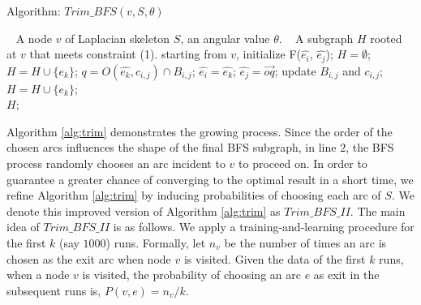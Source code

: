 \begin{algorithm}[t]
\caption{Algorithm: $Trim\_BFS(v, S,\theta)$}
\label{alg:trim}
\begin{algorithmic}[1]
\REQUIRE~
A node $v$ of Laplacian skeleton $S$, an angular value $\theta$.
\ENSURE~
 A subgraph $H$ rooted at $v$ that meets constraint (1).
\STATE starting from $v$, initialize F($\hat{e_i}$, $\hat{e_j}$); $H = \emptyset $;
  \STATE  $H = H \cup \{e_k\}$;
  \STATE $q = O( \hat{e_k}, c_{i,j}) \cap B_{i,j}$;
  \STATE  $\hat{e_i}=  \hat{e_k}$;
  \STATE $\hat{e_j} =  \overrightarrow{oq}$;
  \STATE  update $B_{i,j}$ and $c_{i,j}$;
  \STATE  $H = H \cup \{e_k\}$;
  \ENDIF
\ENDWHILE
\label{code:fram:select} \\
\RETURN  $H$;
\end{algorithmic}
\end{algorithm}

Algorithm \ref{alg:trim} demonstrates the growing process. Since the order of the chosen arcs influences the shape of the final BFS subgraph, in line $2$, the BFS process randomly chooses an arc incident to $v$ to proceed on. In order to guarantee a greater chance of converging to the optimal result in a short time, we refine Algorithm \ref{alg:trim} by inducing probabilities of choosing each arc of $S$. We denote this improved version of Algorithm \ref{alg:trim} as \textbf{$Trim\_BFS\_II$}. The main idea of $Trim\_BFS\_II$ is as follows.
We apply a training-and-learning procedure for the first $k$ (say $1000$) runs. Formally, let $n_v$ be the number of times an arc is chosen as the exit arc when node $v$ is visited. Given the data of the first $k$ runs, when a node $v$ is visited, the probability of choosing an arc $e$ as exit in the subsequent runs is, $P(v, e) = n_v/k$.


